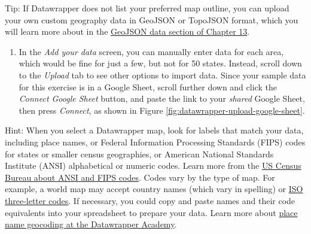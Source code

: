 \documentclass[
  english,
]{book}
\providecommand{\tightlist}{%
  \setlength{\itemsep}{0pt}\setlength{\parskip}{0pt}}
\begin{document}
Tip: If Datawrapper does not list your preferred map outline, you can upload your own custom geography data in GeoJSON or TopoJSON format, which you will learn more about in the \href{geojson.html}{GeoJSON data section of Chapter 13}.

\begin{enumerate}
\def\labelenumi{\arabic{enumi}.}
\setcounter{enumi}{4}
\tightlist
\item
  In the \emph{Add your data} screen, you can manually enter data for each area, which would be fine for just a few, but not for 50 states. Instead, scroll down to the \emph{Upload} tab to see other options to import data. Since your sample data for this exercise is in a Google Sheet, scroll further down and click the \emph{Connect Google Sheet} button, and paste the link to your \emph{shared} Google Sheet, then press \emph{Connect}, as shown in Figure \ref{fig:datawrapper-upload-google-sheet}.
\end{enumerate}

Hint: When you select a Datawrapper map, look for labels that match your data, including place names, or Federal Information Processing Standards (FIPS) codes for states or smaller census geographies, or American National Standards Institute (ANSI) alphabetical or numeric codes. Learn more from the \href{https://www.census.gov/library/reference/code-lists/ansi.html}{US Census Bureau about ANSI and FIPS codes}. Codes vary by the type of map. For example, a world map may accept country names (which vary in spelling) or \href{https://en.wikipedia.org/wiki/List_of_ISO_3166_country_codes}{ISO three-letter codes}. If necessary, you could copy and paste names and their code equivalents into your spreadsheet to prepare your data. Learn more about \href{https://academy.datawrapper.de/article/193-symbol-location-accuracy-using-addresses-place-names}{place name geocoding at the Datawrapper Academy}.
\end{document}
